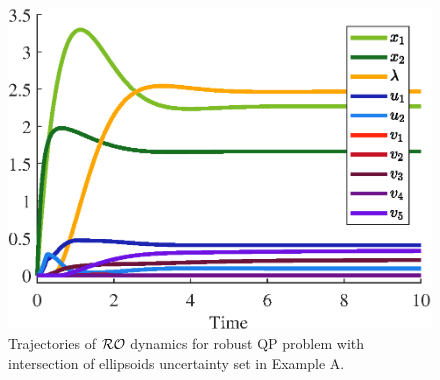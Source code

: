 \documentclass[journal,twoside,web]{ieeecolor}
\newcommand{\rev}[1]{\textcolor{revisionblue}{#1}}
\begin{document}
\begin{figure}
\begin{center}
\includegraphics[scale=0.55]{trajectories_intersection.eps}
\vspace{-1.5mm}
\caption{\rev{Trajectories of ${\cal RO}$ dynamics for robust QP problem with intersection of ellipsoids uncertainty set in Example A.}}
\label{trajectories_norm_intersection}
\end{center}
\end{figure}
\end{document}
